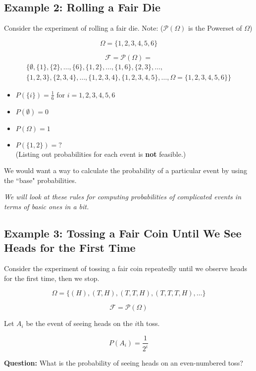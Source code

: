 \documentclass{article}
\begin{document}
\subsection*{Example 2: Rolling a Fair Die}
Consider the experiment of rolling a fair die. Note: (\(\mathcal{P}(\Omega)\) is the Powerset of \(\Omega\))

\[
\Omega = \{1, 2, 3, 4, 5, 6\}
\]

\[
\mathcal{F} = \mathcal{P}(\Omega) =
\]
\[
\begin{aligned}
\{\emptyset, \{1\}, \{2\}, \ldots, \{6\}, \{1, 2\}, \ldots, \{1, 6\}, \{2, 3\}, \ldots, \\
\{1, 2, 3\}, \{2, 3, 4\}, \ldots, \{1, 2, 3, 4\}, \{1, 2, 3, 4, 5\}, \ldots, \Omega = \{1, 2, 3, 4, 5, 6\}\}
\end{aligned}
\]

\begin{itemize}
    \item \(P(\{i\}) = \frac{1}{6}\) for \(i = 1, 2, 3, 4, 5, 6\)
    \item \(P(\emptyset) = 0\)
    \item \(P(\Omega) = 1\)
    \item \(P(\{1, 2\}) = ?\) \\
    (Listing out probabilities for each event is \textbf{not} feasible.)
\end{itemize}

We would want a way to calculate the probability of a particular event by using the ``base" probabilities.

\textit{We will look at these rules for computing probabilities of complicated events in terms of basic ones in a bit.}

\subsection*{Example 3: Tossing a Fair Coin Until We See Heads for the First Time}
Consider the experiment of tossing a fair coin repeatedly until we observe heads for the first time, then we stop.

\[
\Omega = \{(H), (T, H), (T, T, H), (T, T, T, H), \ldots\}
\]

\[
\mathcal{F} = \mathcal{P}(\Omega)
\]

Let \(A_i\) be the event of seeing heads on the \(i\)th toss.

\[
P(A_i) = \frac{1}{2^i}
\]

\textbf{Question:} What is the probability of seeing heads on an even-numbered toss?
\end{document}
